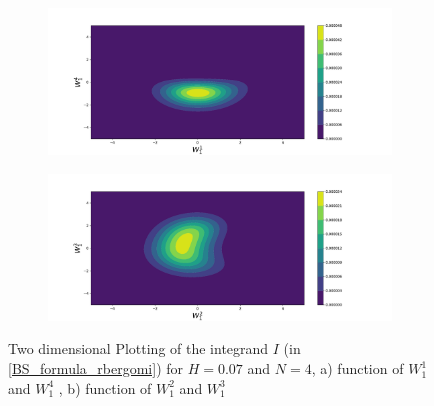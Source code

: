 \documentclass[11pt]{article}
\begin{document}
\begin{figure}[h!]
	\centering
	\begin{subfigure}{.45\textwidth}
		\centering
		\includegraphics[width=1\linewidth]{./figures/integrand_plotting_rBergomi/2D_plots/N_4/H_007/Bergomi_integrand_contours_K_1_H_007_W1_1_4_N_4}
		\caption{}
		\label{fig:sub3}
	\end{subfigure}%
	\begin{subfigure}{.45\textwidth}
		\centering
		\includegraphics[width=1\linewidth]{./figures/integrand_plotting_rBergomi/2D_plots/N_4/H_007/Bergomi_integrand_contours_K_1_H_007_W1_2_3_N_4}
		\caption{}
		\label{fig:sub4}
	\end{subfigure}
	\caption{Two dimensional Plotting of the integrand $I$ (in \eqref{BS_formula_rbergomi})  for $H=0.07$ and $N=4$, a)  function of $W_1^1$ and $W_1^4$ , b) function of $W_1^2$ and $W_1^3$ }
	\label{fig:Integrand_H_007_N_4_2D_W_1_4_2_3}
\end{figure}
\end{document}
